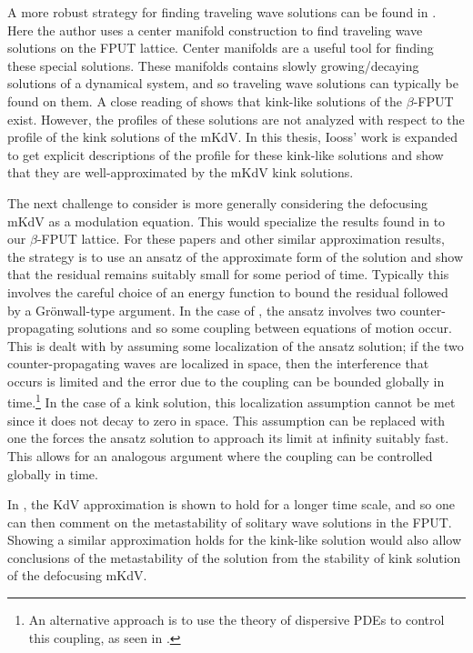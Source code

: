 A more robust strategy for finding traveling wave solutions can be found in \cite{iooss2000travelling}. Here the author uses a center manifold construction to find traveling wave solutions on the FPUT lattice. Center manifolds are a useful tool for finding these special solutions. These manifolds contains slowly growing/decaying solutions of a dynamical system, and so traveling wave solutions can typically be found on them. A close reading of \cite{iooss2000travelling} shows that kink-like solutions of the \(\beta\)-FPUT exist. However, the profiles of these solutions are not analyzed with respect to the profile of the kink solutions of the mKdV. In this thesis, Iooss' work is expanded to get explicit descriptions of the profile for these kink-like solutions and show that they are well-approximated by the mKdV kink solutions.

The next challenge to consider is more generally considering the defocusing mKdV as a modulation equation. This would specialize the results found in \cite{schneider2000counter,khan2017long} to our \(\beta\)-FPUT lattice. For these papers and other similar approximation results, the strategy is to use an ansatz of the approximate form of the solution and show that the residual remains suitably small for some period of time. Typically this involves the careful choice of an energy function  to bound the residual followed by a Gr\"onwall-type argument. In the case of \cite{schneider2000counter}, the ansatz involves two counter-propagating solutions and so some coupling between equations of motion occur. This is dealt with by assuming some localization of the ansatz solution; if the two counter-propagating waves are localized in space, then the interference that occurs is limited and the error due to the coupling can be bounded globally in time.\footnote{An alternative approach is to use the theory of dispersive PDEs to control this coupling, as seen in \cite{hong2021korteweg}.} In the case of a kink solution, this localization assumption cannot be met since it does not decay to zero in space. This assumption can be replaced with one the forces the ansatz solution to approach its limit at infinity suitably fast. This allows for an analogous argument where the coupling can be controlled globally in time. 

In \cite{khan2017long}, the KdV approximation is shown to hold for a longer time scale, and so one can then comment on the metastability of solitary wave solutions in the FPUT. Showing a similar approximation holds for the kink-like solution would also allow conclusions of the metastability of the solution from the stability of kink solution of the defocusing mKdV.

